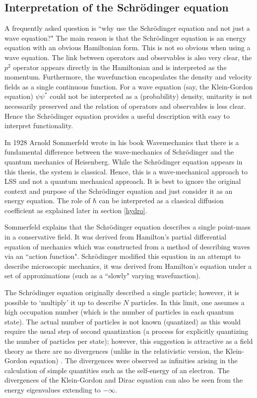 \subsection{Interpretation of the Schr\"odinger equation}
A frequently asked question is ``why use the Schr\"odinger equation and not just a wave equation?" The main reason is that the Schr\"odinger equation is an energy equation with an obvious Hamiltonian form. This is not so obvious when using a wave equation. The link between operators and observables is also very clear, the $p^2$ operator appears directly in the Hamiltonian and is interpreted as the momentum. Furthermore, the wavefunction encapsulates the density and velocity fields as a single continuous function. For a wave equation (say, the Klein-Gordon equation) $\psi \psi^*$ could not be interpreted as a (probability) density, unitarity is not necessarily preserved and the relation of operators and observables is less clear. Hence the Schr\"odinger equation provides a useful description with easy to interpret functionality.

In 1928 Arnold Sommerfeld wrote in his book Wavemechanics \citep{bib_som} that there is a fundamental difference between the wave-mechanics of Schr\"odinger and the quantum mechanics of Heisenberg. While the Schr\"odinger equation appears in this thesis, the system is classical. Hence, this is a wave-mechanical approach to LSS and not a quantum mechanical approach. It is best to ignore the original context and purpose of the Schr\"odinger equation and just consider it as an energy equation. The role of $\hbar$ can be interpreted as a classical diffusion coefficient as explained later in section \ref{hydro}.

Sommerfeld explains that the Schr\"odinger equation describes a single point-mass in a conservative field. It was derived from Hamilton's partial differential equation of mechanics which was constructed from a method of describing waves via an ``action function". Schr\"odinger modified this equation in an attempt to describe microscopic mechanics, it was derived from Hamilton's equation under a set of approximations (such as a ``slowly" varying wavefunction).

The Schr\"odinger equation originally described a single particle; however, it is possible to `multiply' it up to describe $N$ particles. In this limit, one assumes a high occupation number (which is the number of particles in each quantum state). The actual number of particles is not known (quantized) as this would require the usual step of second quantization (a process for explicitly quantizing the number of particles per state); however, this suggestion is attractive as a field theory as there are no divergences (unlike in the relativistic version, the Klein-Gordon equation) \citep{bib_val}. The divergences were observed as infinities arising in the calculation of simple quantities such as the self-energy of an electron. The divergences of the Klein-Gordon and Dirac equation can also be seen from the energy eigenvalues extending to $-\infty$.

